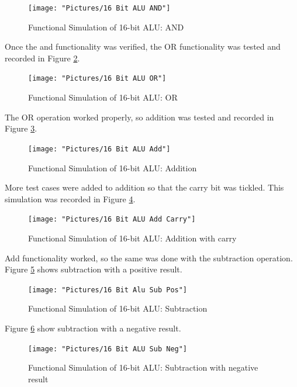 \documentclass[11pt]{article}
\begin{document}
			\begin{figure}[H]
				\centering
				\texttt{[image: "Pictures/16 Bit ALU AND"]}
				\caption{Functional Simulation of 16-bit ALU: AND}
				\label{fig:16-bit-alu-and}
			\end{figure}
		
			Once the and functionality was verified, the OR functionality was tested and recorded in Figure \ref{fig:16-bit-alu-or}.
		
			\begin{figure}[H]
				\centering
				\texttt{[image: "Pictures/16 Bit ALU OR"]}
				\caption{Functional Simulation of 16-bit ALU: OR}
				\label{fig:16-bit-alu-or}
			\end{figure}
			
			The OR operation worked properly, so addition was tested and recorded in Figure \ref{fig:16-bit-alu-add}.
			
			\begin{figure}[H]
				\centering
				\texttt{[image: "Pictures/16 Bit ALU Add"]}
				\caption{Functional Simulation of 16-bit ALU: Addition}
				\label{fig:16-bit-alu-add}
			\end{figure}
		
			More test cases were added to addition so that the carry bit was tickled. This simulation was recorded in Figure \ref{fig:16-bit-alu-add-carry}.
			
			\begin{figure}[H]
				\centering
				\texttt{[image: "Pictures/16 Bit ALU Add Carry"]}
				\caption{Functional Simulation of 16-bit ALU: Addition with carry}
				\label{fig:16-bit-alu-add-carry}
			\end{figure}
			
			Add functionality worked, so the same was done with the subtraction operation. Figure \ref{fig:16-bit-alu-sub-pos} shows subtraction with a positive result.
			
			\begin{figure}[H]
				\centering
				\texttt{[image: "Pictures/16 Bit Alu Sub Pos"]}
				\caption{Functional Simulation of 16-bit ALU: Subtraction}
				\label{fig:16-bit-alu-sub-pos}
			\end{figure}
		
			Figure \ref{fig:16-bit-alu-sub-neg} show subtraction with a negative result.
			
			\begin{figure}[H]
				\centering
				\texttt{[image: "Pictures/16 Bit ALU Sub Neg"]}
				\caption{Functional Simulation of 16-bit ALU: Subtraction with negative result}
				\label{fig:16-bit-alu-sub-neg}
			\end{figure}
		
\end{document}
